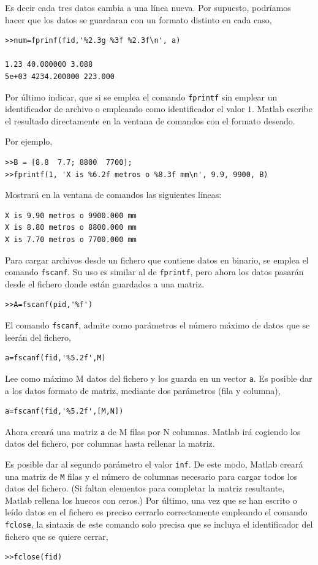 Es decir cada tres datos cambia a una línea nueva. Por supuesto, podríamos hacer que los datos se guardaran con un formato distinto en cada caso,
\begin{verbatim}
>>num=fprinf(fid,'%2.3g %3f %2.3f\n', a)

1.23 40.000000 3.088
5e+03 4234.200000 223.000
\end{verbatim}

Por último indicar, que si se emplea el comando \texttt{fprintf} sin emplear un  identificador de archivo o empleando como identificador el valor $1$. Matlab escribe el resultado directamente en la ventana de comandos con el formato deseado.

Por ejemplo, 
\begin{verbatim}
>>B = [8.8  7.7; 8800  7700];
>>fprintf(1, 'X is %6.2f metros o %8.3f mm\n', 9.9, 9900, B)
\end{verbatim}
Mostrará en la ventana de comandos las siguientes líneas:
\begin{verbatim}
X is 9.90 metros o 9900.000 mm
X is 8.80 metros o 8800.000 mm
X is 7.70 metros o 7700.000 mm
\end{verbatim}


Para cargar archivos desde un fichero que contiene datos en binario, se emplea el comando \texttt{fscanf}. Su uso es similar al de \texttt{fprintf}, pero ahora los datos pasarán desde el fichero donde están guardados a una matriz.

\begin{verbatim}
>>A=fscanf(pid,'%f')
\end{verbatim}

El comando \texttt{fscanf}, admite como parámetros  el número máximo de datos que se leerán del fichero,
\begin{verbatim}
a=fscanf(fid,'%5.2f',M)
\end{verbatim}
Lee como máximo M datos del fichero y los guarda en un vector \texttt{a}. Es posible dar a los datos formato de matriz, mediante dos parámetros (fila y columna),
\begin{verbatim}
a=fscanf(fid,'%5.2f',[M,N])
\end{verbatim}
Ahora creará una matriz \texttt{a} de M filas por N columnas. Matlab irá cogiendo los datos del fichero, por columnas hasta rellenar la matriz.

Es posible dar al segundo parámetro el valor \texttt{inf}. De este modo, Matlab creará una matriz de \texttt{M} filas y el número de columnas necesario para cargar todos los datos del fichero. (Si faltan elementos para completar la matriz resultante, Matlab rellena los huecos con ceros.)
Por último, una vez que se han escrito o leído datos en el fichero es preciso cerrarlo correctamente empleando el comando \texttt{fclose}, la sintaxis de este comando solo precisa que se incluya el identificador del fichero que se quiere cerrar,
\begin{verbatim}
>>fclose(fid)
\end{verbatim}

